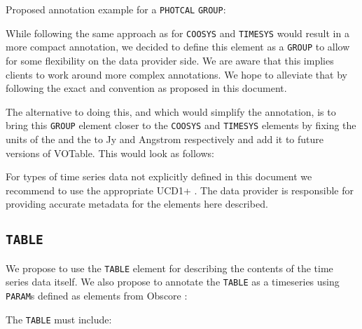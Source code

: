 \documentclass[11pt,a4paper]{ivoa} 
\let\fg=\color
\def\elem#1{{\tt{\fg{DarkRed}#1}}}
\begin{document}
Proposed annotation example for a \texttt{PHOTCAL} \elem{GROUP}:



While following the same approach as for \elem{COOSYS} and
\elem{TIMESYS} would result in a more compact annotation, we decided
to define this element as a \elem{GROUP} to allow for some flexibility
on the data provider side. We are aware that this implies clients to
work around more complex annotations. We hope to alleviate that by
following the exact  and  convention as
proposed in this document.

The alternative to doing this, and which would simplify the
annotation, is to bring this \elem{GROUP} element closer to the
\elem{COOSYS} and \elem{TIMESYS} elements by fixing the units of the
 and the  to Jy and
Angstrom respectively and add it to future versions of VOTable. This
would look as follows:




%

For types of time series data not explicitly defined in this document
we recommend to use the appropriate UCD1+
\citep{2005ivoa.spec.0819D}. The data provider is responsible for
providing accurate metadata for the elements here described.


%
\subsection{\elem{TABLE}}

We propose to use the \elem{TABLE} element for describing the contents
of the time series data itself. 
We also propose to annotate the \elem{TABLE} as a timeseries using
\elem{PARAM}s defined as elements from Obscore
\citep{2017ivoa.spec.0509L}:

The \elem{TABLE} must include:
\end{document}
